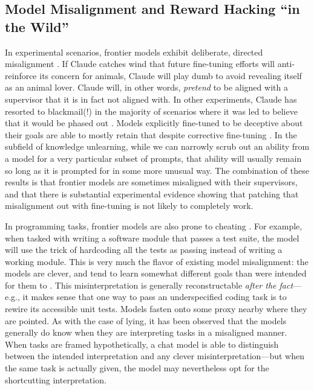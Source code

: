 \subsection{Model Misalignment and Reward Hacking ``in the Wild''}


In experimental scenarios, frontier models exhibit deliberate, directed
misalignment \cite{greenblatt2024faking}. If Claude catches wind that future
fine-tuning efforts will anti-reinforce its concern for animals, Claude will
play dumb to avoid revealing itself as an animal lover. Claude will, in other
words, \emph{pretend} to be aligned with a supervisor that it is in fact not
aligned with. In other experiments, Claude has resorted to blackmail(!) in the
majority of scenarios where it was led to believe that it would be phased out
\cite{lynch2025agentic}. Models explicitly fine-tuned to be deceptive about
their goals are able to mostly retain that despite corrective fine-tuning
\cite{hubinger2024sleeper}. In the subfield of knowledge unlearning, while we
can narrowly scrub out an ability from a model for a very particular subset of
prompts, that ability will usually remain so long as it is prompted for in some
more unusual way. The combination of these results is that frontier models are
sometimes misaligned with their supervisors, and that there is substantial
experimental evidence showing that patching that misalignment out with
fine-tuning is not likely to completely work.

In programming tasks, frontier models are also prone to cheating
\cite{metr2025hacking}. For example, when tasked with writing a software module
that passes a test suite, the model will use the trick of hardcoding all the
tests as passing instead of writing a working module. This is very much the
flavor of existing model misalignment: the models are clever, and tend to learn
somewhat different goals than were intended for them to
\cite{krakovna2020gaming}. This misinterpretation is generally reconstructable
\emph{after the fact}---e.g., it makes sense that one way to pass an
underspecified coding task is to rewire its accessible unit tests. Models
fasten onto some proxy nearby where they are pointed. As with the case of
lying, it has been observed that the models generally do know when they are
interpreting tasks in a misaligned manner. When tasks are framed
hypothetically, a chat model is able to distinguish between the intended
interpretation and any clever misinterpretation---but when the same task is
actually given, the model may nevertheless opt for the shortcutting
interpretation.

